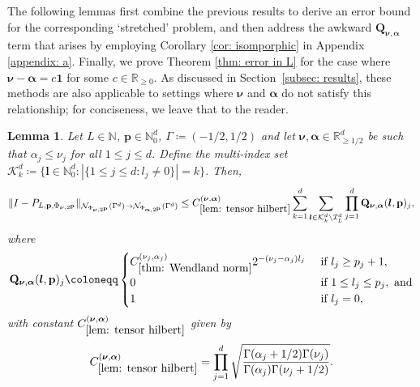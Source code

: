 \documentclass[pdflatex,sn-mathphys-num]{sn-jnl}%
\theoremstyle{thmstyleone}%
\newtheorem{lemma}{Lemma}%
\theoremstyle{thmstyletwo}%
\theoremstyle{thmstylethree}%
\begin{document}
The following lemmas first combine the previous results to derive an error bound for the corresponding `stretched' problem, and then address the awkward \(\mathbf{Q}_{\boldsymbol{\nu},\boldsymbol{\alpha}}\) term that arises by employing Corollary \ref{cor: isomporphic} in Appendix \ref{appendix: a}. Finally, we prove Theorem \ref{thm: error in L} for the case where \(\boldsymbol{\nu}-\boldsymbol{\alpha}=c\mathbf{1}\) for some \(c\in\mathbb{R}_{\geq0}\). As discussed in Section~\ref{subsec: results}, these methods are also applicable to settings where \(\boldsymbol{\nu}\) and \(\boldsymbol{\alpha}\) do not satisfy this relationship; for conciseness, we leave that to the reader.

\begin{lemma}\label{lem: tensor hilbert}
Let \(L\in\mathbb{N}\), \(\mathbf{p}\in\mathbb{N}_0^d\), \(\Gamma\coloneqq (-1/2,1/2)\) and let \(\boldsymbol{\nu},\boldsymbol{\alpha}\in\mathbb{R}^d_{\geq1/2}\) be such that \(\alpha_j\leq\nu_j\) for all \(1\leq j \leq d\). Define the multi-index set \(\mathcal{K}^d_k\coloneqq\{\boldsymbol{l}\in\mathbb{N}_{0}^d:|\{1\leq j\leq d:l_j\neq0\}|=k\}\). Then,
    \begin{align}
    \|I-P_{L,\mathbf{p},\Phi_{\boldsymbol{\nu},2^{\mathbf{p}}}}\|_{\mathcal{N}_{\Phi_{\boldsymbol{\nu},2^{\mathbf{p}}}}(\Gamma^d)\rightarrow\mathcal{N}_{\Phi_{\boldsymbol{\alpha},2^{\mathbf{p}}}}(\Gamma^d)}\leq C^{(\boldsymbol{\nu},\boldsymbol{\alpha})}_{\ref{lem: tensor hilbert}}\sum_{k=1}^d\sum_{\boldsymbol{l}\in\mathcal{K}_k^d\setminus \mathcal{I}^d_L}\prod_{j=1}^d\mathbf{Q}_{\boldsymbol{\nu},\boldsymbol{\alpha}}(\boldsymbol{l},\mathbf{p})_j,\nonumber
    \end{align}
    where
    \begin{align}
        \mathbf{Q}_{\boldsymbol{\nu},\boldsymbol{\alpha}}(\boldsymbol{l},\mathbf{p})_j \coloneqq \begin{cases}
            C^{(\nu_j,\alpha_j)}_{\ref{thm: Wendland norm}}2^{-(\nu_j-\alpha_j)l_j} & \textrm{ if }l_j\geq p_j+1,\\
            0 & \textrm{ if }1\leq l_j\leq p_j, \textrm{ and}\\
            1 & \textrm{ if }l_j = 0,
        \end{cases}\nonumber
    \end{align}
    with constant \(C^{(\boldsymbol{\nu},\boldsymbol{\alpha})}_{\ref{lem: tensor hilbert}}\) given by
    \begin{align}
        C^{(\boldsymbol{\nu},\boldsymbol{\alpha})}_{\ref{lem: tensor hilbert}} = \prod_{j=1}^d\sqrt{\frac{\Gamma(\alpha_j+1/2)\Gamma(\nu_j)}{\Gamma(\alpha_j)\Gamma(\nu_j+1/2)}}.\nonumber
    \end{align}

    
\end{lemma}
\end{document}
